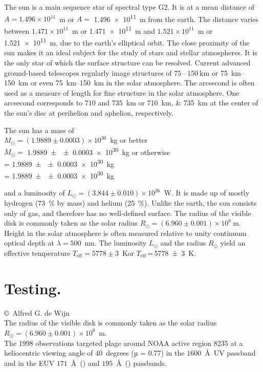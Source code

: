 The sun is a main sequence star of spectral type G2.
It is at a mean distance of $A=1.496\times10^{11}$~m or $A=$ \SI{1.496e11}{\meter} from the earth.
The distance varies between $1.471\times10^{11}$~m or \SI{1.471e11}{\meter} and $1.521\times10^{11}$~m or \SI{1.521e11}{\meter}, due to the earth's elliptical orbit.
The close proximity of the sun makes it an ideal subject for the study of stars and stellar atmospheres.
It is the only star of which the surface structure can be resolved.
Current advanced ground-based telescopes regularly image structures of $75$\,--\,$\SI{150}{\kilo\meter}$ or \SIrange{75}{150}{\kilo\metre} or even \SIrange[range-phrase = --,range-units=single]{75}{150}{\kilo\metre} in the solar atmosphere.
The arcsecond is often used as a measure of length for fine structure in the solar atmosphere.
One arcsecond corresponds to $710$ and $735$~km or \SIlist{710;735}{\kilo\metre} at the center of the sun's disc at perihelion and aphelion, respectively.

The sun has a mass of\\
$M_\odot=(1.9889\pm0.0003)\times10^{30}$~kg or better\\
$M_\odot=$ \SI[multi-part-units = brackets]{1.9889\pm\pm0.0003e30}{\kilogram} or otherwise\\
\si{\Msun} = \SI[multi-part-units = brackets]{1.9889\pm\pm0.0003e30}{\kilogram}\\
\si{\Msun} = \SI[separate-uncertainty = false]{1.9889\pm\pm0.0003e30}{\kilogram}

and a luminosity of $L_\odot=(3.844\pm0.010)\times10^{26}$~W\@.
It is made up of mostly hydrogen (\SI{73}{\percent} by mass) and helium (\SI{25}{\percent}).
Unlike the earth, the sun consists only of gas, and therefore has no well-defined surface.
The radius of the visible disk is commonly taken as the solar radius $R_\odot=(6.960\pm0.001)\times10^8~\mathrm{m}$.
Height in the solar atmosphere is often measured relative to unity continuum optical depth at $\lambda=500$~nm.
The luminosity $L_\odot$ and the radius $R_\odot$ yield an effective temperature $T_\mathrm{eff}=5778\pm3$~K\@ or $T_\mathrm{eff}$\,=\,\SI{5778\pm3}{\kelvin}\@.

\section[Testing]{Testing. \hyperlink{toc}{\hyperback}}

\copyright~Alfred G. de Wijn\\
The radius of the visible disk is commonly taken as the solar radius $R_\odot=(6.960\pm0.001)\times10^8$~m.\\
The 1998 observations targeted plage around NOAA active region 8235 at a heliocentric viewing angle of $40$~degrees (µ = 0.77) in the $1600$~\AA\ UV passband and in the EUV $171$~\AA\ () and $195$~\AA\ () passbands.

